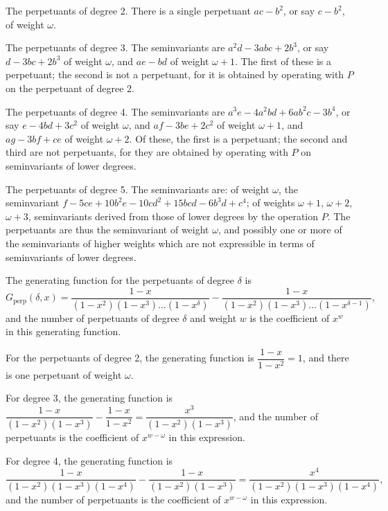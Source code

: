 \documentclass[11pt,a4paper]{book}
\begin{document}
\setcounter{art}{53}
\begin{art}
The perpetuants of degree 2. There is a single perpetuant $ac - b^{2}$, or say $c - b^{2}$, of weight $\omega$.
\end{art}

\setcounter{art}{54}
\begin{art}
The perpetuants of degree 3. The seminvariants are $a^{2}d - 3abc + 2b^{3}$, or say $d - 3bc + 2b^{3}$ of weight $\omega$, and $ae - bd$ of weight $\omega + 1$. The first of these is a perpetuant; the second is not a perpetuant, for it is obtained by operating with $P$ on the perpetuant of degree 2.
\end{art}

\setcounter{art}{55}
\begin{art}
The perpetuants of degree 4. The seminvariants are $a^{3}e - 4a^{2}bd + 6ab^{2}c - 3b^{4}$, or say $e - 4bd + 3c^{2}$ of weight $\omega$, and $af - 3be + 2c^{2}$ of weight $\omega + 1$, and $ag - 3bf + ce$ of weight $\omega + 2$. Of these, the first is a perpetuant; the second and third are not perpetuants, for they are obtained by operating with $P$ on seminvariants of lower degrees.
\end{art}

\setcounter{art}{56}
\begin{art}
The perpetuants of degree 5. The seminvariants are: of weight $\omega$, the seminvariant $f - 5ce + 10b^{2}e - 10cd^{2} + 15bcd - 6b^{3}d + c^{4}$; of weights $\omega + 1$, $\omega + 2$, $\omega + 3$, seminvariants derived from those of lower degrees by the operation $P$. The perpetuants are thus the seminvariant of weight $\omega$, and possibly one or more of the seminvariants of higher weights which are not expressible in terms of seminvariants of lower degrees.
\end{art}

\setcounter{art}{57}
\begin{art}
The generating function for the perpetuants of degree $\delta$ is
\[
G_{\text{perp}}(\delta, x) = \frac{1 - x}{(1 - x^{2})(1 - x^{3})\ldots(1 - x^{\delta})} - \frac{1 - x}{(1 - x^{2})(1 - x^{3})\ldots(1 - x^{\delta - 1})},
\]
and the number of perpetuants of degree $\delta$ and weight $w$ is the coefficient of $x^{w}$ in this generating function.
\end{art}

\setcounter{art}{58}
\begin{art}
For the perpetuants of degree 2, the generating function is $\dfrac{1 - x}{1 - x^{2}} = 1$, and there is one perpetuant of weight $\omega$.

For degree 3, the generating function is $\dfrac{1 - x}{(1 - x^{2})(1 - x^{3})} - \dfrac{1 - x}{1 - x^{2}} = \dfrac{x^{3}}{(1 - x^{2})(1 - x^{3})}$, and the number of perpetuants is the coefficient of $x^{w - \omega}$ in this expression.

For degree 4, the generating function is
\[
\frac{1 - x}{(1 - x^{2})(1 - x^{3})(1 - x^{4})} - \frac{1 - x}{(1 - x^{2})(1 - x^{3})} = \frac{x^{4}}{(1 - x^{2})(1 - x^{3})(1 - x^{4})},
\]
and the number of perpetuants is the coefficient of $x^{w - \omega}$ in this expression.
\end{art}
\end{document}
